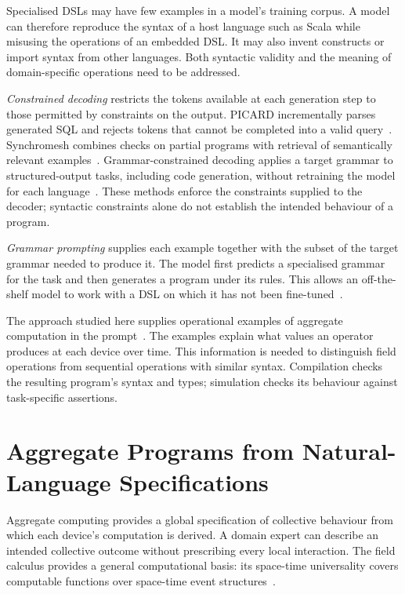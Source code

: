 Specialised \acp{DSL} may have few examples in a model's training corpus.
A model can therefore reproduce the syntax of a host language such as Scala while misusing the operations of an embedded DSL.
It may also invent constructs or import syntax from other languages.
Both syntactic validity and the meaning of domain-specific operations need to be addressed.

\emph{Constrained decoding} restricts the tokens available at each generation step to those permitted by constraints on the output.
PICARD incrementally parses generated SQL and rejects tokens that cannot be completed into a valid query~\cite{DBLP:conf/emnlp/ScholakSB21}.
Synchromesh combines checks on partial programs with retrieval of semantically relevant examples~\cite{DBLP:conf/iclr/PoesiaP00SMG22}.
Grammar-constrained decoding applies a target grammar to structured-output tasks, including code generation, without retraining the model for each language~\cite{DBLP:conf/emnlp/GengJP023}.
These methods enforce the constraints supplied to the decoder; syntactic constraints alone do not establish the intended behaviour of a program.

\emph{Grammar prompting} supplies each example together with the subset of the target grammar needed to produce it.
The model first predicts a specialised grammar for the task and then generates a program under its rules.
This allows an off-the-shelf model to work with a DSL on which it has not been fine-tuned~\cite{DBLP:conf/nips/WangW0CSK23}.

The approach studied here supplies operational examples of aggregate computation in the prompt~\cite{DBLP:journals/tiot/AguzziFV25}.
The examples explain what values an operator produces at each device over time.
This information is needed to distinguish field operations from sequential operations with similar syntax.
Compilation checks the resulting program's syntax and types; simulation checks its behaviour against task-specific assertions.

\section{Aggregate Programs from Natural-Language Specifications}
\label{sec:llm-macroprogramming-motivation}

Aggregate computing provides a global specification of collective behaviour from which each device's computation is derived.
A domain expert can describe an intended collective outcome without prescribing every local interaction.
The field calculus provides a general computational basis:
its space-time universality covers computable functions over space-time event structures~\cite{DBLP:conf/coordination/AudritoBDV18}.

